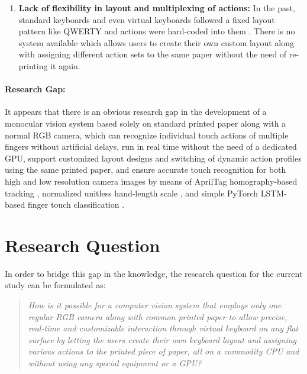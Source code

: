 \begin{enumerate}
    \item \textbf{Lack of flexibility in layout and multiplexing of actions:} In the past, standard keyboards and even virtual keyboards followed a fixed layout pattern like QWERTY and actions were hard-coded into them \cite{ReviewVirtualKeyboard2020}. There is no system available which allows users to create their own custom layout along with assigning different action sets to the same paper without the need of re-printing it again.
\end{enumerate}

\paragraph{Research Gap:} It appears that there is an obvious research gap in the development of a monocular vision system based solely on standard printed paper along with a normal RGB camera, which can recognize individual touch actions of multiple fingers without artificial delays, run in real time without the need of a dedicated GPU, support customized layout designs and switching of dynamic action profiles using the same printed paper, and ensure accurate touch recognition for both high and low resolution camera images by means of AprilTag homography-based tracking \cite{Wang2016AprilTag2, Kallwies2020Determining}, normalized unitless hand-length scale \cite{Zhang2020MediaPipe}, and simple PyTorch LSTM-based finger touch classification \cite{Hochreiter1997LSTM, Gammulle2021TMMF}.

\section{Research Question}
\label{sec:research_question}
In order to bridge this gap in the knowledge, the research question for the current study can be formulated as:

\begin{quote}
\textit{How is it possible for a computer vision system that employs only one regular RGB camera along with common printed paper to allow precise, real-time and customizable interaction through virtual keyboard on any flat surface by letting the users create their own keyboard layout and assigning various actions to the printed piece of paper, all on a commodity CPU and without using any special equipment or a GPU?}
\end{quote}

